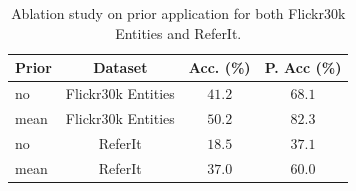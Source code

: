 \begin{table}
  \centering
  \begin{tabular}{l|ccc}
    \toprule
    Prior & Dataset & Acc. (\%) & P. Acc (\%) \\
    \midrule
    no & Flickr30k Entities & $41.2$ & $68.1$ \\
    mean & Flickr30k Entities & $50.2$ & $82.3$ \\
    \midrule
    no & ReferIt & $18.5$ & $37.1$ \\
    mean & ReferIt & $37.0$ & $60.0$ \\
    \bottomrule
  \end{tabular}
  \caption[Ablation study on prior application for both Flickr30k
    Entities and ReferIt]{ Ablation study on prior application for
    both Flickr30k Entities and ReferIt.}
  \label{tab:ablation-study}
\end{table}
